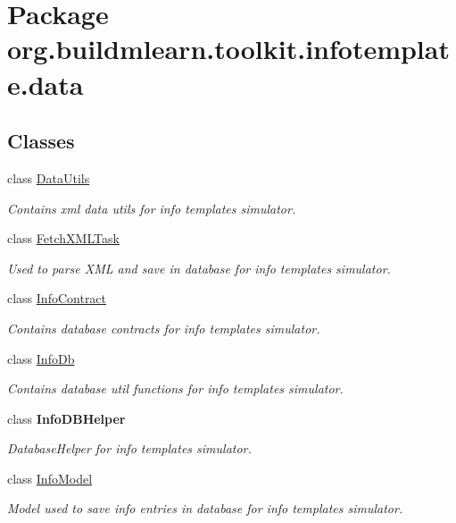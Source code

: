 \hypertarget{namespaceorg_1_1buildmlearn_1_1toolkit_1_1infotemplate_1_1data}{}\section{Package org.\+buildmlearn.\+toolkit.\+infotemplate.\+data}
\label{namespaceorg_1_1buildmlearn_1_1toolkit_1_1infotemplate_1_1data}
\subsection*{Classes}
\begin{DoxyCompactItemize}
\item 
class \hyperlink{classorg_1_1buildmlearn_1_1toolkit_1_1infotemplate_1_1data_1_1DataUtils}{Data\+Utils}
\begin{DoxyCompactList}\small\item\em Contains xml data utils for info template\textquotesingle{}s simulator. \end{DoxyCompactList}\item 
class \hyperlink{classorg_1_1buildmlearn_1_1toolkit_1_1infotemplate_1_1data_1_1FetchXMLTask}{Fetch\+X\+M\+L\+Task}
\begin{DoxyCompactList}\small\item\em Used to parse X\+ML and save in database for info template\textquotesingle{}s simulator. \end{DoxyCompactList}\item 
class \hyperlink{classorg_1_1buildmlearn_1_1toolkit_1_1infotemplate_1_1data_1_1InfoContract}{Info\+Contract}
\begin{DoxyCompactList}\small\item\em Contains database contracts for info template\textquotesingle{}s simulator. \end{DoxyCompactList}\item 
class \hyperlink{classorg_1_1buildmlearn_1_1toolkit_1_1infotemplate_1_1data_1_1InfoDb}{Info\+Db}
\begin{DoxyCompactList}\small\item\em Contains database util functions for info template\textquotesingle{}s simulator. \end{DoxyCompactList}\item 
class {\bfseries Info\+D\+B\+Helper}
\begin{DoxyCompactList}\small\item\em Database\+Helper for info template\textquotesingle{}s simulator. \end{DoxyCompactList}\item 
class \hyperlink{classorg_1_1buildmlearn_1_1toolkit_1_1infotemplate_1_1data_1_1InfoModel}{Info\+Model}
\begin{DoxyCompactList}\small\item\em Model used to save info entries in database for info template\textquotesingle{}s simulator. \end{DoxyCompactList}\end{DoxyCompactItemize}
